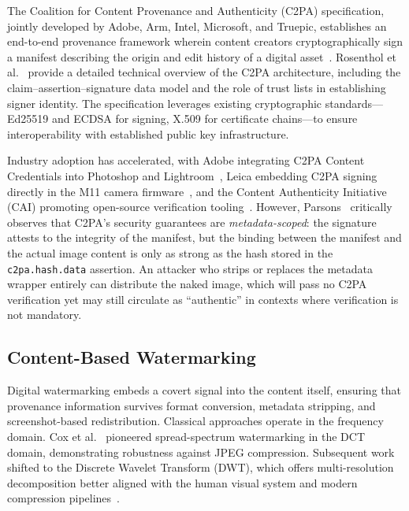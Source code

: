 \documentclass[conference]{IEEEtran}
\begin{document}
The Coalition for Content Provenance and Authenticity (C2PA) specification,
jointly developed by Adobe, Arm, Intel, Microsoft, and Truepic,
establishes an end-to-end provenance framework wherein content creators
cryptographically sign a manifest describing the origin and edit history
of a digital asset~\cite{c2pa_spec}.
Rosenthol et al.~\cite{rosenthol2022c2pa} provide a detailed technical
overview of the C2PA architecture, including the claim–assertion–signature
data model and the role of trust lists in establishing signer identity.
The specification leverages existing cryptographic standards—Ed25519
and ECDSA for signing, X.509 for certificate chains—to ensure
interoperability with established public key infrastructure.

Industry adoption has accelerated, with Adobe integrating C2PA Content
Credentials into Photoshop and Lightroom~\cite{adobe_content_credentials},
Leica embedding C2PA signing directly in the M11 camera
firmware~\cite{leica_m11_content_credentials}, and the Content Authenticity
Initiative (CAI) promoting open-source verification
tooling~\cite{cai_opensource}.
However, Parsons~\cite{parsons2023integrity} critically observes that
C2PA's security guarantees are \textit{metadata-scoped}: the signature
attests to the integrity of the manifest, but the binding between the
manifest and the actual image content is only as strong as the hash stored
in the \texttt{c2pa.hash.data} assertion.
An attacker who strips or replaces the metadata wrapper entirely
can distribute the naked image, which will pass no C2PA verification
yet may still circulate as ``authentic'' in contexts where verification
is not mandatory.

\subsection{Content-Based Watermarking}

Digital watermarking embeds a covert signal into the content itself,
ensuring that provenance information survives format conversion, metadata
stripping, and screenshot-based redistribution.
Classical approaches operate in the frequency domain.
Cox et al.~\cite{cox2007digital} pioneered spread-spectrum watermarking in
the DCT domain, demonstrating robustness against JPEG compression.
Subsequent work shifted to the Discrete Wavelet Transform (DWT), which
offers multi-resolution decomposition better aligned with the human visual
system and modern compression pipelines~\cite{barni2003improved_dwt,
zhang2023robust_dwt}.
\end{document}
